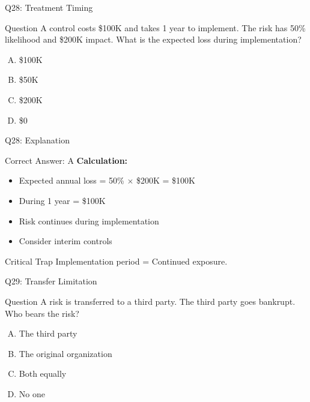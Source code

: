 \documentclass{beamer}
\begin{document}
			\begin{frame}{Q28: Treatment Timing}
				\begin{block}{Question}
					A control costs \$100K and takes 1 year to implement. The risk has 50\% likelihood and \$200K impact. What is the expected loss during implementation?
				\end{block}
				\begin{enumerate}[(A)]
					\item \$100K
					\item \$50K
					\item \$200K
					\item \$0
				\end{enumerate}
			\end{frame}
			
			\begin{frame}{Q28: Explanation}
				\begin{block}{Correct Answer: A}
					\textbf{Calculation:}
					\begin{itemize}
						\item Expected annual loss = 50\% $\times$ \$200K = \$100K
						\item During 1 year = \$100K
						\item Risk continues during implementation
						\item Consider interim controls
					\end{itemize}
				\end{block}
				\begin{alertblock}{Critical Trap}
					Implementation period = Continued exposure.
				\end{alertblock}
			\end{frame}
			
			\begin{frame}{Q29: Transfer Limitation}
				\begin{block}{Question}
					A risk is transferred to a third party. The third party goes bankrupt. Who bears the risk?
				\end{block}
				\begin{enumerate}[(A)]
					\item The third party
					\item The original organization
					\item Both equally
					\item No one
				\end{enumerate}
			\end{frame}
			
\end{document}
